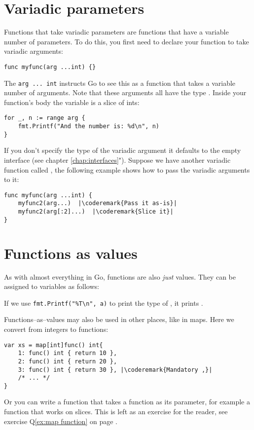 \section{Variadic parameters}
Functions that take variadic parameters are functions that have a
variable number of parameters. To do this, you first
need to declare your function to take variadic arguments:
\begin{lstlisting}
func myfunc(arg ...int) {}
\end{lstlisting}
The \lstinline{arg ... int} instructs Go to see this as a function that
takes a variable number of arguments. Note that these arguments all
have the type . Inside your function's body the variable
 is a slice of ints:
\begin{lstlisting}
for _, n := range arg {
    fmt.Printf("And the number is: %d\n", n)
}
\end{lstlisting}
If you don't specify the type of the variadic argument it defaults to the
empty interface  (see chapter
\ref{chap:interfaces}").
Suppose we have another variadic function called , the 
following example shows how to pass the variadic arguments to it:
\begin{lstlisting}
func myfunc(arg ...int) {
    myfunc2(arg...)  |\coderemark{Pass it as-is}|
    myfunc2(arg[:2]...)  |\coderemark{Slice it}|
}
\end{lstlisting}

\section{Functions as values}
\label{sec:functions as values}
As with almost everything in Go, functions are also \emph{just} values.
They can be assigned to variables as follows:

If we use \lstinline{fmt.Printf("%T\n", a)} to print the type of
, it prints .

Functions--as--values may also be used in other places, like in maps.
Here we convert from integers to functions:
\begin{lstlisting}[caption=Functions as values in maps]
var xs = map[int]func() int{
    1: func() int { return 10 },
    2: func() int { return 20 },
    3: func() int { return 30 }, |\coderemark{Mandatory ,}|
    /* ... */
}
\end{lstlisting}
Or you can write a function that takes a function as its parameter, for
example a  function that works on  slices. This is
left as an exercise for the reader, see exercise Q\ref{ex:map function}
on page \pageref{ex:map function}.

